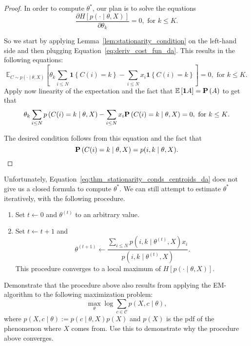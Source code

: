 \begin{proof}
In order to compute $\theta^*$, our plan is to solve the equations
%
\begin{equation}
\frac{\partial H \left[p(\cdot \mid \theta, X)\right]}{\partial \theta_k} = 0, \text{ for $k \leq K$}.
\end{equation}

So we start by applying Lemma~\ref{lem:stationarity_condition} on the left-hand side and then plugging Equation~\ref{eq:deriv_cost_fun_da}. This results in the following equations:
%
\begin{equation}
\mathbb{E}_{C \sim p(\cdot \mid \theta, X)}\left[\theta_k \sum_{i \leq N} \mathbf{1}\left\{C(i) = k\right\} - \sum_{i \leq N} x_i \mathbf{1}\left\{C(i) = k\right\}\right] = 0, \text{ for $k \leq K$}.
\end{equation}
%
Apply now linearity of the expectation and the fact that $\mathbb{E}\left[\mathbf{1}A\right] = \mathbf{P}\left(A\right)$ to get that
%
\begin{equation}
\theta_k \sum_{i \leq N} p\left(C(i) = k \mid \theta, X\right) - \sum_{i \leq N}x_i \mathbf{P}\left(C(i) = k \mid \theta, X\right) = 0, \text{ for $k \leq K$}.
\end{equation}

The desired condition follows from this equation and the fact that 
%
\begin{equation}
\mathbf{P}\left(C(i) = k \mid \theta, X\right) = p(i, k \mid \theta, X).
\end{equation}
\end{proof}

Unfortunately, Equation~\ref{eq:thm_stationarity_conds_centroids_da} does not give us a closed formula to compute $\theta^*$. We can still attempt to estimate $\theta^*$ iteratively, with the following
procedure.

\begin{enumerate}
\item Set $t \gets 0$ and $\theta^(t)$ to an arbitrary value.
\item Set $t \gets t + 1$ and
%
\begin{equation}
\theta^{(t+1)} \gets \frac{\sum_{i \leq N} p\left(i, k \mid \theta^{(t)}, X\right)x_i}{p\left(i,k \mid \theta^{(t)}, X\right)}.
\end{equation}
%
This procedure converges to a local maximum of $H[p(\cdot \mid \theta, X)]$.
\end{enumerate}

\begin{exercise}
Demonstrate that the procedure above also results from applying
the EM-algorithm to the following maximization problem:
%
\begin{equation}
\max_{\theta} \log \sum_{c \in \mathcal{C}} p(X, c \mid \theta),
\end{equation}
%
where $p(X, c \mid \theta) := p(c \mid \theta, X)p(X)$ and $p(X)$ is the pdf of the phenomenon where $X$ comes from. Use this to demonstrate why the procedure above
converges.
\end{exercise}

